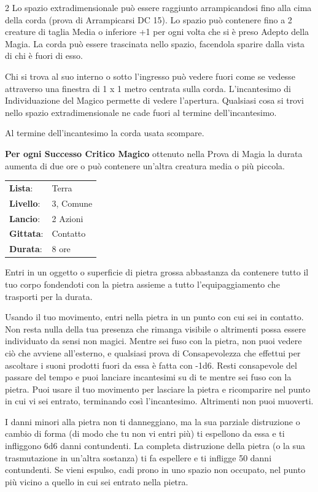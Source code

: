 \begin{multicols}{2}
Lo spazio extradimensionale può essere raggiunto arrampicandosi fino alla cima della corda (prova di Arrampicarsi DC 15). Lo spazio può contenere fino a 2 creature di taglia Media o inferiore +1 per ogni volta che si è preso Adepto della Magia. La corda può essere trascinata nello spazio, facendola sparire dalla vista di chi è fuori di esso.

Chi si trova al suo interno o sotto l'ingresso può vedere fuori come se vedesse attraverso una finestra di 1 x 1 metro centrata sulla corda. L'incantesimo di Individuazione del Magico permette di vedere l'apertura. Qualsiasi cosa si trovi nello spazio extradimensionale ne cade fuori al termine dell'incantesimo.

Al termine dell'incantesimo la corda usata scompare.

\textbf{Per ogni Successo Critico Magico} ottenuto nella Prova di Magia la durata aumenta di due ore o può contenere un'altra creatura media o più piccola.

\noindent\begin{tabularx}{\linewidth}{p{1.9cm}X}
	\rowcolor{gray!20}\textbf{Lista}: & Terra \\
	\textbf{Livello}: & 3, Comune \\
	\rowcolor{gray!20}\textbf{Lancio}: & 2 Azioni \\
	\textbf{Gittata}: & Contatto \\
	\rowcolor{gray!20}\textbf{Durata}: & 8 ore \\
\end{tabularx}\smallskip

Entri in un oggetto o superficie di pietra grossa abbastanza da contenere tutto il tuo corpo fondendoti con la pietra assieme a tutto l'equipaggiamento che trasporti per la durata.

Usando il tuo movimento, entri nella pietra in un punto con cui sei in contatto. Non resta nulla della tua presenza che rimanga visibile o altrimenti possa essere individuato da sensi non magici. Mentre sei fuso con la pietra, non puoi vedere ciò che avviene all'esterno, e qualsiasi prova di Consapevolezza che effettui per ascoltare i suoni prodotti fuori da essa è fatta con -1d6. Resti consapevole del passare del tempo e puoi lanciare incantesimi su di te mentre sei fuso con la pietra. Puoi usare il tuo movimento per lasciare la pietra e ricomparire nel punto in cui vi sei entrato, terminando così l'incantesimo. Altrimenti non puoi muoverti.

I danni minori alla pietra non ti danneggiano, ma la sua parziale distruzione o cambio di forma (di modo che tu non vi entri più) ti espellono da essa e ti infliggono 6d6 danni contundenti. La completa distruzione della pietra (o la sua trasmutazione in un'altra sostanza) ti fa espellere e ti infligge 50 danni contundenti. Se vieni espulso, cadi prono in uno spazio non occupato, nel punto più vicino a quello in cui sei entrato nella pietra.


\end{multicols}
